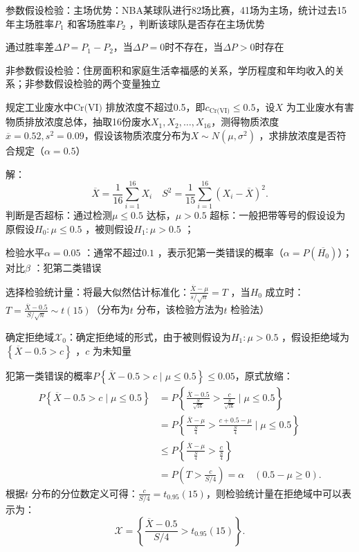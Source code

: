 \begin{eg}
    参数假设检验：主场优势：NBA某球队进行82场比赛，41场为主场，统计过去15年主场胜率$P_1$ 和客场胜率$P_2$ ，判断该球队是否存在主场优势
\end{eg}
通过胜率差$\Delta P=P_1-P_2$，当$\Delta P=0$时不存在，当$\Delta P>0$时存在
\begin{notation}
    非参数假设检验：住房面积和家庭生活幸福感的关系，学历程度和年均收入的关系；非参数假设检验的两个变量独立
\end{notation}
\begin{eg}
    规定工业废水中$\text{Cr(VI)}$ 排放浓度不超过0.5，即$c_\text{Cr(VI)}\le 0.5$，设$X$ 为工业废水有害物质排放浓度总体，抽取16份废水$X_1,X_2,\ldots ,X_{16}$，测得物质浓度$\overline{x}=0.52,s^2 =0.09$，假设该物质浓度分布为$X\sim N\left( \mu,\sigma^2  \right)$ ，求排放浓度是否符合规定（$\alpha=0.5$）
\end{eg}
解：\[
    \overline{X}=\frac{1}{16}\sum_{i=1}^{16} X_{i}\quad S^2 =\frac{1}{15}\sum_{i=1}^{16} \left( X_{i}-\overline{X} \right)^2 
.\]
判断是否超标：通过检测$\mu\le 0.5$ 达标，$\mu>0.5$ 超标：一般把带等号的假设设为原假设$H_0:\mu\le 0.5$ ，被则假设$H_1:\mu>0.5$ ；

检验水平$\alpha=0.05$ ：通常不超过$0.1$ ，表示犯第一类错误的概率（$\alpha=P\left( \overline{H_0} \right)$）；对比$\beta$ ：犯第二类错误

选择检验统计量：将最大似然估计标准化：$\frac{\overline{X}-\mu}{s /\sqrt{n}}=T$ ，当$H_0$ 成立时：$T=\frac{\overline{X}-0.5}{S /\sqrt{n}}\sim t\left( 15 \right)$（分布为$t$ 分布，该检验方法为$t$ 检验法）

确定拒绝域$\mathscr{X}_0$：确定拒绝域的形式，由于被则假设为$H_1:\mu>0.5$ ，假设拒绝域为$\left\{ \overline{X}-0.5>c \right\}$ ，$c$ 为未知量

犯第一类错误的概率$P\left\{ \overline{X}-0.5>c \mid \mu\le 0.5 \right\}\le 0.05$，原式放缩：
\begin{align*}
    P\left\{ \overline{X}-0.5>c \mid \mu\le 0.5 \right\}&= P\left\{ \frac{\overline{X}-0.5}{\frac{S}{\sqrt{16}}}>\frac{c}{\frac{S}{\sqrt{16}}} \mid \mu\le 0.5\right\} \\
    &= P\left\{ \frac{\overline{X}-\mu}{\frac{S}{4}}>\frac{c+0.5-\mu}{\frac{S}{4}}\mid \mu\le 0.5 \right\} \\
    &\le P\left\{ \frac{\overline{X}-\mu}{\frac{S}{4}}>\frac{c}{\frac{S}{4}} \right\}\\
    &= P\left( T>\frac{c}{S /4} \right) =\alpha \quad \left( 0.5-\mu\ge 0 \right)
.\end{align*}
根据$t$ 分布的分位数定义可得：$\frac{c}{S /4}=t_{0.95}\left( 15 \right)$，则检验统计量在拒绝域中可以表示为：\[
    \mathscr{X}=\left\{ \frac{\overline{X}-0.5}{S /4}>t_{0.95}\left( 15 \right) \right\}
.\]


